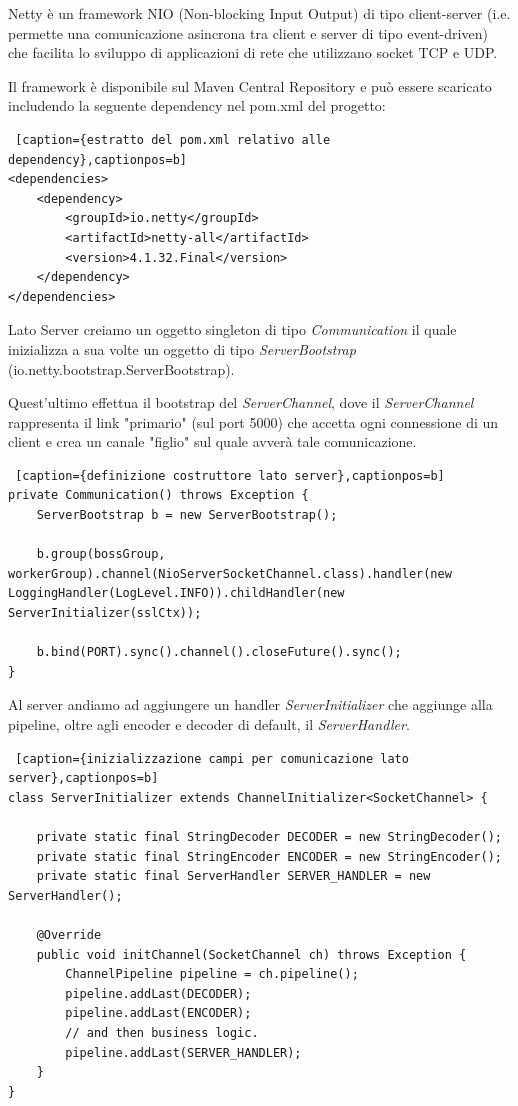 Netty è un framework NIO (Non-blocking Input Output) di tipo client-server (i.e. permette una comunicazione asincrona tra client e server di tipo event-driven) che facilita lo sviluppo di applicazioni di rete che utilizzano socket TCP e UDP.

Il framework è disponibile sul Maven Central Repository e può essere scaricato includendo la seguente dependency nel pom.xml del progetto:
\begin{lstlisting} [caption={estratto del pom.xml relativo alle dependency},captionpos=b]
<dependencies>
	<dependency>
		<groupId>io.netty</groupId>
		<artifactId>netty-all</artifactId>
		<version>4.1.32.Final</version>
	</dependency>
</dependencies>
\end{lstlisting}

Lato Server creiamo un oggetto singleton di tipo \textit{Communication} il quale inizializza a sua volte un oggetto di tipo \textit{ServerBootstrap} (io.netty.bootstrap.ServerBootstrap).

Quest'ultimo effettua il bootstrap del \textit{ServerChannel}, dove il \textit{ServerChannel} rappresenta il link "primario" (sul port 5000) che accetta ogni connessione di un client e crea un canale "figlio" sul quale avverà tale comunicazione.

\begin{lstlisting} [caption={definizione costruttore lato server},captionpos=b]
private Communication() throws Exception {
	ServerBootstrap b = new ServerBootstrap();

	b.group(bossGroup, workerGroup).channel(NioServerSocketChannel.class).handler(new LoggingHandler(LogLevel.INFO)).childHandler(new ServerInitializer(sslCtx));

	b.bind(PORT).sync().channel().closeFuture().sync();
}
\end{lstlisting}
\newpage
Al server andiamo ad aggiungere un handler \textit{ServerInitializer} che aggiunge alla pipeline, oltre agli encoder e decoder di default, il \textit{ServerHandler}.

\begin{lstlisting} [caption={inizializzazione campi per comunicazione lato server},captionpos=b]
class ServerInitializer extends ChannelInitializer<SocketChannel> {

	private static final StringDecoder DECODER = new StringDecoder();
	private static final StringEncoder ENCODER = new StringEncoder();
	private static final ServerHandler SERVER_HANDLER = new ServerHandler();
	
	@Override
	public void initChannel(SocketChannel ch) throws Exception {
		ChannelPipeline pipeline = ch.pipeline();
		pipeline.addLast(DECODER);
		pipeline.addLast(ENCODER);
		// and then business logic.
		pipeline.addLast(SERVER_HANDLER);
	}
}
\end{lstlisting}

